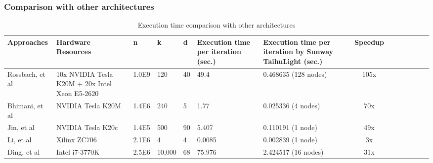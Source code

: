 
\subsubsection{Comparison with other architectures}

\begin{table}
  \caption{Execution time comparison with other architectures}
  \center
  \label{ccpu}
   \begin{tabular}{p{2.4cm} p{3.1cm} p{1cm} p{1cm}p{0.5cm}p{2.3cm}p{3.5cm} c c c c c c c}
   \toprule[1pt]
    Approaches&Hardware Resources &n & k & d& Execution time per iteration (sec.) & Execution time per iteration by Sunway TaihuLight (sec.) & Speedup\\
    \toprule[1pt]
    Rossbach, et al\cite{rossbach2013dandelion} &10x NVIDIA Tesla K20M + 20x Intel Xeon E5-2620&1.0E9 &120 &40 &49.4&0.468635 (128 nodes) & 105x\\
    Bhimani, et al\cite{bhimani2015accelerating} &NVIDIA Tesla K20M&1.4E6 &240 &5 &1.77&0.025336 (4 nodes) & 70x\\
    Jin, et al\cite{jin2018high} &NVIDIA Tesla K20c&1.4E5&500&90&5.407&0.110191 (1 node) & 49x\\ 
    Li, et al\cite{li2016high}&Xilinx ZC706&2.1E6&4&4&0.0085&0.002839 (1 node) & 3x\\
    Ding, et al\cite{ding2015yinyang} &Intel i7-3770K&2.5E6 &10,000 &68 &75.976&2.424517 (16 nodes) & 31x\\

    \bottomrule
  \end{tabular}
\end{table}

